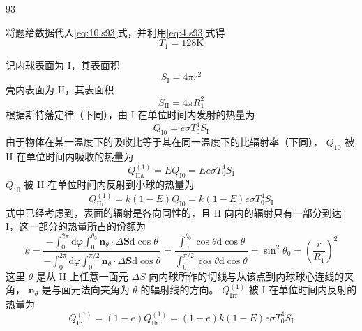 \begin{solution}{93}
\begin{subsolution}
将题给数据代入\eqref{eq:10.s93}式，并利用\eqref{eq:4.s93}式得
\begin{equation}
T _ {1} = 1 2 8 \mathrm{K}
\label{eq:11.s93}
\end{equation}
\end{subsolution}
\begin{subsolution}
记内球表面为 I，其表面积
\begin{equation}
S _ {\mathrm{I}} = 4 \pi r ^ {2}
\label{eq:12.s93}
\end{equation}
壳内表面为 II，其表面积
\begin{equation}
S _ {\mathrm{II}} = 4 \pi R _ {1} ^ {2}
\label{eq:13.s93}
\end{equation}
根据斯特藩定律（下同），由 I 在单位时间内发射的热量为
\begin{equation}
Q _ {\mathrm{I0}} = e \sigma T _ {0} ^ {4} S _ {\mathrm{I}}
\label{eq:14.s93}
\end{equation}
由于物体在某一温度下的吸收比等于其在同一温度下的比辐射率（下同）， $Q_{10}$ 被 II 在单位时间内吸收的热量为
\begin{equation}
Q _ {\mathrm{IIa}} ^ {(1)} = E Q _ {\mathrm{I0}} = E e \sigma T _ {0} ^ {4} S _ {\mathrm{I}}
\label{eq:15.s93}
\end{equation}
$Q_{10}$ 被 II 在单位时间内反射到小球的热量为
\begin{equation}
Q _ {\mathrm{IIr}} ^ {(1)} = k (1 - E) Q _ {\mathrm{I0}} = k (1 - E) e \sigma T _ {0} ^ {4} S _ {\mathrm{I}}
\label{eq:16.s93}
\end{equation}
式中已经考虑到，表面的辐射是各向同性的，且 II 向内的辐射只有一部分到达 I，这一部分的热量所占的份额为
\begin{equation}
k = \frac {- \int_ {0} ^ {2 \pi} \mathrm{d} \varphi \int_ {0} ^ {\theta_ {0}} \boldsymbol {n} _ {\theta} \cdot \Delta \boldsymbol {S} \mathrm{d} \cos \theta}{- \int_ {0} ^ {2 \pi} \mathrm{d} \varphi \int_ {0} ^ {\pi / 2} \boldsymbol {n} _ {\theta} \cdot \Delta \boldsymbol {S} \mathrm{d} \cos \theta} = \frac {\int_ {0} ^ {\theta_ {0}} \cos \theta \mathrm{d} \cos \theta}{\int_ {0} ^ {\pi / 2} \cos \theta \mathrm{d} \cos \theta} = \sin^ {2} \theta_ {0} = \left(\frac {r}{R _ {1}}\right) ^ {2}
\label{eq:17.s93}
\end{equation}
这里 $\theta$ 是从 II 上任意一面元 $\Delta S$ 向内球所作的切线与从该点到内球球心连线的夹角， $\boldsymbol{n}_{\theta}$ 是与面元法向夹角为 $\theta$ 的辐射线的方向。 $Q_{\mathrm{Irr}}^{(1)}$ 被 I 在单位时间内反射的热量为
\begin{equation}
Q _ {\mathrm{Ir}} ^ {(1)} = (1 - e) Q _ {\mathrm{Ilr}} ^ {(1)} = (1 - e) k (1 - E) e \sigma T _ {0} ^ {4} S _ {\mathrm{I}}

\end{equation}
\end{subsolution}
\end{solution}
